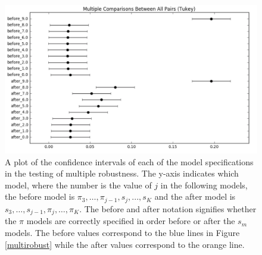 \begin{figure}
\includegraphics[width = 1.1\linewidth]{figures/Tukey.png}
\caption{A plot of the confidence intervals of each of the model specifications in the testing of multiple robustness.  The y-axis indicates which model, where the number is the value of $j$ in the following models, the before model is $\pi_3,\dots, \pi_{j-1},s_j,...,s_K$ and the after model is $s_3, \dots, s_{j-1}, \pi_j, \dots, \pi_K$.  The before and after notation signifies whether the $\pi$ models are correctly specified in order before or after the $s_m$ models.  The before values correspond to the blue lines in Figure \ref{multirobust} while the after values correspond to the orange line.}
\label{Tukey}
\end{figure} 


